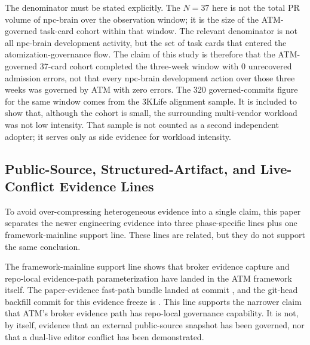 \documentclass[9pt,letterpaper]{extarticle}
\begin{document}
The denominator must be stated explicitly. The $N = 37$ here is not the total PR volume of npc-brain over the observation window; it is the size of the ATM-governed task-card cohort within that window. The relevant denominator is not {}all npc-brain development activity{}, but {}the set of task cards that entered the atomization-governance flow{}. The claim of this study is therefore that the ATM-governed 37-card cohort completed the three-week window with 0 unrecovered admission errors, not that every npc-brain development action over those three weeks was governed by ATM with zero errors. The 320 governed-commits figure for the same window comes from the 3KLife alignment sample. It is included to show that, although the cohort is small, the surrounding multi-vendor workload was not low intensity. That sample is not counted as a second independent adopter; it serves only as side evidence for workload intensity.

\subsection{Public-Source, Structured-Artifact, and Live-Conflict Evidence Lines}

To avoid over-compressing heterogeneous evidence into a single claim, this paper separates the newer engineering evidence into three phase-specific lines plus one framework-mainline support line. These lines are related, but they do not support the same conclusion.

The framework-mainline support line shows that broker evidence capture and repo-local evidence-path parameterization have landed in the ATM framework itself. The paper-evidence fast-path bundle landed at commit \texttt{}, and the git-head backfill commit for this evidence freeze is \texttt{}. This line supports the narrower claim that ATM's broker evidence path has repo-local governance capability. It is not, by itself, evidence that an external public-source snapshot has been governed, nor that a dual-live editor conflict has been demonstrated.
\end{document}
